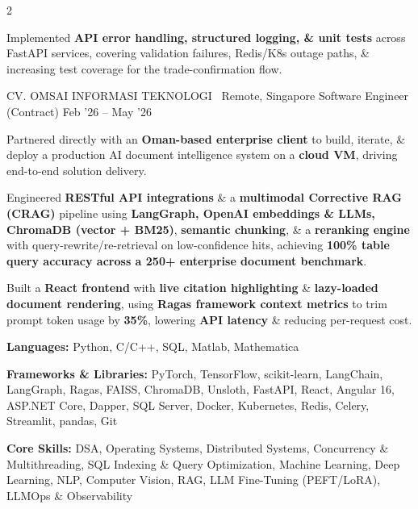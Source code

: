 \documentclass{resume}
\begin{document}
\begin{paracol}{2}
{\begin{resumeItemize}
\item Implemented \textbf{API error handling, structured logging, \& unit tests} across FastAPI services, covering validation failures, Redis/K8s outage paths, \& increasing test coverage for the trade-confirmation flow.
\end{resumeItemize}
}
\resumeExperience
{CV. OMSAI INFORMASI TEKNOLOGI \hfill {\normalfont\small\faMapMarker*\ Remote, Singapore}}
{\textcolor{subheadingblue}{Software Engineer (Contract)}}
{Feb '26 -- May '26}
{
\begin{resumeItemize}
\item Partnered directly with an \textbf{Oman-based enterprise client} to build, iterate, \& deploy a production AI document intelligence system on a \textbf{cloud VM}, driving end-to-end solution delivery.

\item Engineered \textbf{RESTful API integrations} \& a \textbf{multimodal Corrective RAG (CRAG)} pipeline using \textbf{LangGraph, OpenAI embeddings \& LLMs, ChromaDB (vector + BM25)}, \textbf{semantic chunking}, \& a \textbf{reranking engine} with query-rewrite/re-retrieval on low-confidence hits, achieving \textbf{100\% table query accuracy across a 250+ enterprise document benchmark}.

\item Built a \textbf{React frontend} with \textbf{live citation highlighting} \& \textbf{lazy-loaded document rendering}, using \textbf{Ragas framework context metrics} to trim prompt token usage by \textbf{35\%}, lowering \textbf{API latency} \& reducing per-request cost.
\end{resumeItemize}
}

\begin{resumeItemize}
\item \textbf{Languages:} Python, C/C++, SQL, Matlab, Mathematica
\item \textbf{Frameworks \& Libraries:} PyTorch, TensorFlow, scikit-learn, LangChain, LangGraph, Ragas, FAISS, ChromaDB, Unsloth, FastAPI, React, Angular 16, ASP.NET Core, Dapper, SQL Server, Docker, Kubernetes, Redis, Celery, Streamlit, pandas, Git
\item \textbf{Core Skills:} DSA, Operating Systems, Distributed Systems, Concurrency \& Multithreading, SQL Indexing \& Query Optimization, Machine Learning, Deep Learning, NLP, Computer Vision, RAG, LLM Fine-Tuning (PEFT/LoRA), LLMOps \& Observability
\end{resumeItemize}


\end{paracol}
\end{document}
